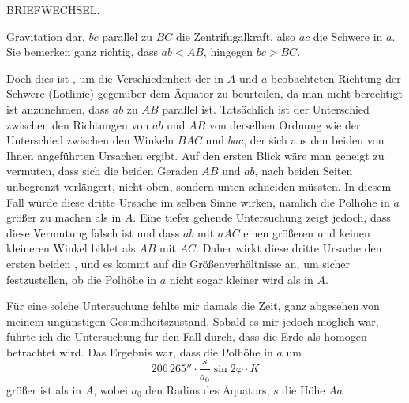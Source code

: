 \clearpage
{}\hfill BRIEFWECHSEL.\hfill\mbox{}\par
\noindent Gravitation dar, $bc$ parallel zu $BC$ die Zentrifugalkraft, also $ac$ die Schwere in $a$. Sie bemerken ganz richtig, dass $ab<AB$, hingegen $bc>BC$.
\begin{center}
\end{center}
Doch dies ist , um die Verschiedenheit der in $A$ und $a$ beobachteten Richtung der Schwere (Lotlinie) gegenüber dem Äquator zu beurteilen, da man nicht berechtigt ist anzunehmen, dass $ab$ zu $AB$ parallel ist. Tatsächlich ist der Unterschied zwischen den Richtungen von $ab$ und $AB$ von derselben Ordnung wie der Unterschied zwischen den Winkeln $BAC$ und $bac$, der sich aus den beiden von Ihnen angeführten Ursachen ergibt. Auf den ersten Blick wäre man geneigt zu vermuten, dass sich die beiden Geraden $AB$ und $ab$, nach beiden Seiten unbegrenzt verlängert, nicht oben, sondern unten schneiden müssten. In diesem Fall würde diese dritte Ursache im selben Sinne wirken, nämlich die Polhöhe in $a$ größer zu machen als in $A$. Eine tiefer gehende Untersuchung zeigt jedoch, dass diese Vermutung falsch ist und dass $ab$ mit $aAC$ einen größeren und keinen kleineren Winkel bildet als $AB$ mit $AC$. Daher wirkt diese dritte Ursache den ersten beiden , und es kommt auf die Größenverhältnisse an, um sicher festzustellen, ob die Polhöhe in $a$ nicht sogar kleiner wird als in $A$.

Für eine solche Untersuchung fehlte mir damals die Zeit, ganz abgesehen von meinem ungünstigen Gesundheitszustand. Sobald es mir jedoch möglich war, führte ich die Untersuchung für den Fall durch, dass die Erde als homogen betrachtet wird. Das Ergebnis war, dass die Polhöhe in $a$ um
\[
206\,265''\cdot\frac s{a_0}\sin2\varphi\cdot K
\]
größer ist als in $A$, wobei $a_0$ den Radius des Äquators, $s$ die Höhe $Aa$


